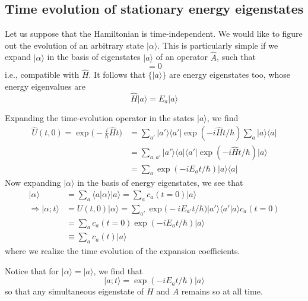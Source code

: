 \subsection{Time evolution of stationary energy eigenstates}
Let us suppose that the Hamiltonian is time-independent. We
would like to figure out the evolution of an arbitrary state
$\vert \alpha\rangle $. This is particularly simple if we expand
$\vert \alpha\rangle $ in the basis of eigenstates $\vert a\rangle $ of an operator
$\hat{A}$, such that
\begin{equation}
  [\hat{A}, \hat{H}] = 0
  \label{equ:2.21}
\end{equation}
i.e., compatible with $\hat{H}$. It follows that $\{\vert a\rangle \}$
are energy eigenstates too, whose energy eigenvalues are
\begin{equation}
  \hat{H} \vert a\rangle  = E_a \vert a\rangle 
  \label{equ:2.22}
\end{equation}

Expanding the time-evolution operator in the states $\vert a\rangle $,
we find
\begin{align}
  \hat{U}(t, 0) = \exp\Big(-\frac{i}{\hbar} \hat{H}t\Big) &= 
  \sum_{a'} \vert a'\rangle \langle a'\vert  \exp(-i \hat{H} t / \hbar) \sum_a
  \vert a\rangle \langle a\vert \nonumber\\
  &=
  \sum_{a,a'} \vert a'\rangle \langle a\vert  \langle a'\vert \exp(-i\hat{H}t/\hbar)
  \vert a\rangle \nonumber\\
  &=
  \sum_a \exp(-i E_a t /\hbar) \vert a\rangle \langle a\vert 
  \label{equ:2.23}
\end{align}
Now expanding $\vert \alpha\rangle $ in the basis of energy eigenstates,
we see that
\begin{align*}
\vert \alpha\rangle  &= \sum_a \langle a\vert \alpha\rangle  \vert a\rangle  = \sum_a c_a(t=0) \vert a\rangle 
  \nonumber\\
  \Rightarrow \vert \alpha;t\rangle  &= U(t,0) \vert \alpha\rangle  = \sum_{a'}
  \exp\Big(-i E_{a'}t/\hbar\Big) \vert a'\rangle \langle a'\vert a\rangle  c_a(t=0)
  \nonumber\\
  &=
  \sum_a c_a(t= 0) \exp(-iE_a t/\hbar) \vert a\rangle \\
  &\equiv \sum_a c_a(t) \vert a\rangle  \label{equ:2.24}
\end{align*}
where we realize the time evolution of the expansion
coefficients.

Notice that for $\vert \alpha\rangle  = \vert a\rangle $, we find that
\begin{equation}
  \vert a;t\rangle  = \exp(-i E_a t/\hbar) \vert a\rangle 
  \label{equ:2.25}
\end{equation}
so that any simultaneous eigenstate of $H$ and $A$ remains
so at all time.
